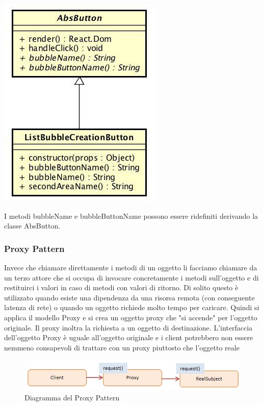 \begin{center}
	\includegraphics[scale=0.35]{img/esempio3.jpg}
\end{center}

I metodi bubbleName e bubbleButtonName possono essere ridefiniti derivando la classe AbsButton.


\subsubsection{Proxy Pattern}
Invece che chiamare direttamente i metodi di un oggetto li facciamo chiamare da un terzo attore che si occupa di invocare concretamente i metodi sull'oggetto e di restituirci i valori in caso di metodi con valori di ritorno. 
Di solito questo è utilizzato quando esiste una dipendenza da una risorsa remota (con conseguente latenza di rete) o quando un oggetto richiede molto tempo per caricare.
Quindi si applica il modello Proxy e si crea un oggetto proxy che "si
accende" per l'oggetto originale. Il proxy inoltra la richiesta a un
oggetto di destinazione. L'interfaccia dell'oggetto Proxy è uguale
all'oggetto originale e i client potrebbero non essere nemmeno
consapevoli di trattare con un proxy piuttosto che l'oggetto reale 

	\FloatBarrier
	\begin{figure}[ht]
		\centering
		\includegraphics[scale=0.45]{img/javascript-proxy.jpg}
		\caption{Diagramma del Proxy Pattern}
	\end{figure}
	
